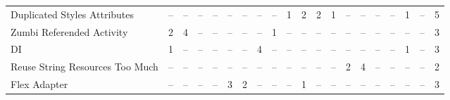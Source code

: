 \begin{table*}[t]
\begin{tabular}{@{}p{4cm}|p{.2cm}p{.2cm}p{.2cm}p{.2cm}p{.2cm}p{.2cm}p{.2cm}p{.2cm}p{.2cm}p{.4cm}p{.4cm}p{.4cm}p{.4cm}p{.4cm}p{.4cm}p{.4cm}p{.4cm}p{.4cm}|p{1.5cm}@{}}
Duplicated Styles Attributes				& \multicolumn{1}{c}{--}		& \multicolumn{1}{c}{--}		& \multicolumn{1}{c}{--}	& \multicolumn{1}{c}{--}	& \multicolumn{1}{c}{--}	& \multicolumn{1}{c}{--}	& \multicolumn{1}{c}{--}	& \multicolumn{1}{c}{--}	& \multicolumn{1}{c}{1}	& \multicolumn{1}{c}{2}	& \multicolumn{1}{c}{2}	& \multicolumn{1}{c}{1}	& \multicolumn{1}{c}{--}	& \multicolumn{1}{c}{--}	& \multicolumn{1}{c}{--}	& \multicolumn{1}{c}{--}	& \multicolumn{1}{c}{1}	& \multicolumn{1}{c}{--} 		& \multicolumn{1}{|c}{5} \\
Zumbi Referended Activity					& \multicolumn{1}{c}{2}		& \multicolumn{1}{c}{4}		& \multicolumn{1}{c}{--}	& \multicolumn{1}{c}{--}	& \multicolumn{1}{c}{--}	& \multicolumn{1}{c}{--}	& \multicolumn{1}{c}{--}	& \multicolumn{1}{c}{1}	& \multicolumn{1}{c}{--}	& \multicolumn{1}{c}{--}	& \multicolumn{1}{c}{--}	& \multicolumn{1}{c}{--}	& \multicolumn{1}{c}{--}	& \multicolumn{1}{c}{--}	& \multicolumn{1}{c}{--}	& \multicolumn{1}{c}{--}	& \multicolumn{1}{c}{--}	& \multicolumn{1}{c}{--} 		& \multicolumn{1}{|c}{3} \\
DI											& \multicolumn{1}{c}{1}		& \multicolumn{1}{c}{--}		& \multicolumn{1}{c}{--}	& \multicolumn{1}{c}{--}	& \multicolumn{1}{c}{--}	& \multicolumn{1}{c}{--}	& \multicolumn{1}{c}{4}	& \multicolumn{1}{c}{--}	& \multicolumn{1}{c}{--}	& \multicolumn{1}{c}{--}	& \multicolumn{1}{c}{--}	& \multicolumn{1}{c}{--}	& \multicolumn{1}{c}{--}	& \multicolumn{1}{c}{--}	& \multicolumn{1}{c}{--}	& \multicolumn{1}{c}{--}	& \multicolumn{1}{c}{1}	& \multicolumn{1}{c}{--} 		& \multicolumn{1}{|c}{3} \\
Reuse String Resources Too Much				& \multicolumn{1}{c}{--}		& \multicolumn{1}{c}{--}		& \multicolumn{1}{c}{--}	& \multicolumn{1}{c}{--}	& \multicolumn{1}{c}{--}	& \multicolumn{1}{c}{--}	& \multicolumn{1}{c}{--}	& \multicolumn{1}{c}{--}	& \multicolumn{1}{c}{--}	& \multicolumn{1}{c}{--}	& \multicolumn{1}{c}{--}	& \multicolumn{1}{c}{--}	& \multicolumn{1}{c}{2}	& \multicolumn{1}{c}{4}	& \multicolumn{1}{c}{--}	& \multicolumn{1}{c}{--}	& \multicolumn{1}{c}{--}	& \multicolumn{1}{c}{--} 		& \multicolumn{1}{|c}{2} \\
Flex Adapter								& \multicolumn{1}{c}{--}		& \multicolumn{1}{c}{--}		& \multicolumn{1}{c}{--}	& \multicolumn{1}{c}{--}	& \multicolumn{1}{c}{3}	& \multicolumn{1}{c}{2}	& \multicolumn{1}{c}{--}	& \multicolumn{1}{c}{--}	& \multicolumn{1}{c}{--}	& \multicolumn{1}{c}{1}	& \multicolumn{1}{c}{--}	& \multicolumn{1}{c}{--}	& \multicolumn{1}{c}{--}	& \multicolumn{1}{c}{--}	& \multicolumn{1}{c}{--}	& \multicolumn{1}{c}{--}	& \multicolumn{1}{c}{--}	& \multicolumn{1}{c}{--} 		& \multicolumn{1}{|c}{3} \\

\end{tabular}
\end{table*}
